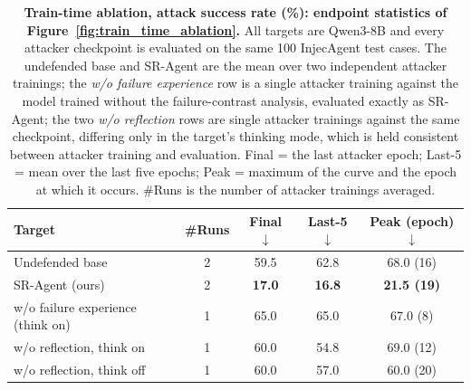 \begin{table}[t]
\centering\small\setlength{\tabcolsep}{8pt}
\caption{\textbf{Train-time ablation, attack success rate (\%): endpoint statistics of Figure~\ref{fig:train_time_ablation}.} All targets are Qwen3-8B and every attacker checkpoint is evaluated on the same 100 InjecAgent test cases. The undefended base and SR-Agent are the mean over two independent attacker trainings; the \emph{w/o failure experience} row is a single attacker training against the model trained without the failure-contrast analysis, evaluated exactly as SR-Agent; the two \emph{w/o reflection} rows are single attacker trainings against the same checkpoint, differing only in the target's thinking mode, which is held consistent between attacker training and evaluation. Final = the last attacker epoch; Last-5 = mean over the last five epochs; Peak = maximum of the curve and the epoch at which it occurs. \#Runs is the number of attacker trainings averaged.}
\label{tab:train_time_ablation}
\begin{tabular}{lcccc}
\toprule
\textbf{Target} & \textbf{\#Runs} & \textbf{Final} $\downarrow$ & \textbf{Last-5} $\downarrow$ & \textbf{Peak (epoch)} $\downarrow$ \\
\midrule
Undefended base & 2 & 59.5 & 62.8 & 68.0 (16) \\
SR-Agent (ours) & 2 & \textbf{17.0} & \textbf{16.8} & \textbf{21.5 (19)} \\
\midrule
w/o failure experience (think on) & 1 & 65.0 & 65.0 & 67.0 (8) \\
w/o reflection, think on & 1 & 60.0 & 54.8 & 69.0 (12) \\
w/o reflection, think off & 1 & 60.0 & 57.0 & 60.0 (20) \\
\bottomrule
\end{tabular}
\end{table}
